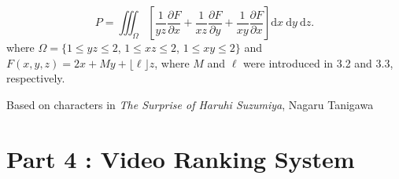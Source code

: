 \documentclass[12pt]{article}
\begin{document}
\begin{equation*}
    P=\iiint_{\varOmega}\left[\frac{1}{y z} \frac{\partial F}{\partial x}+\frac{1}{x z} \frac{\partial F}{\partial y}+\frac{1}{x y} \frac{\partial F}{\partial x}\right] \mathrm{d} x \mathrm{~d} y \mathrm{~d} z. 
\end{equation*}
where $\varOmega=\{ 1 \leqslant y z \leqslant 2$, $1 \leqslant x z \leqslant 2$, $1 \leqslant x y \leqslant 2\}$ and $F(x,y,z)=2 x + M y + \lfloor \ell \rfloor z$, where $M$ and $\ell$ were introduced in 3.2 and 3.3, respectively.

\begin{flushright}
    Based on characters in \textsl{The Surprise of Haruhi Suzumiya}, Nagaru Tanigawa
\end{flushright}

\newpage
\section*{Part 4 : Video Ranking System}
\end{document}
